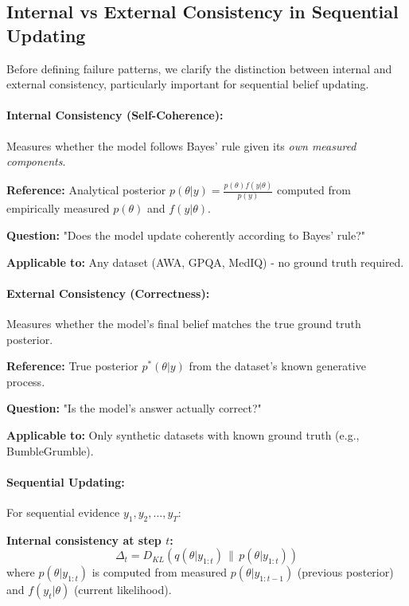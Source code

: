 \documentclass{article}
\theoremstyle{definition}
\begin{document}
\subsection{Internal vs External Consistency in Sequential Updating}

Before defining failure patterns, we clarify the distinction between internal and external consistency, particularly important for sequential belief updating.

\paragraph{Internal Consistency (Self-Coherence):} Measures whether the model follows Bayes' rule given its \emph{own measured components}.

\textbf{Reference:} Analytical posterior $p(\theta|y) = \frac{p(\theta) f(y|\theta)}{p(y)}$ computed from empirically measured $p(\theta)$ and $f(y|\theta)$.

\textbf{Question:} "Does the model update coherently according to Bayes' rule?"

\textbf{Applicable to:} Any dataset (AWA, GPQA, MedIQ) - no ground truth required.

\paragraph{External Consistency (Correctness):} Measures whether the model's final belief matches the true ground truth posterior.

\textbf{Reference:} True posterior $p^*(\theta|y)$ from the dataset's known generative process.

\textbf{Question:} "Is the model's answer actually correct?"

\textbf{Applicable to:} Only synthetic datasets with known ground truth (e.g., BumbleGrumble).

\paragraph{Sequential Updating:} For sequential evidence $y_1, y_2, \ldots, y_T$:

\textbf{Internal consistency at step $t$:}
\begin{equation}
\Delta_t = D_{KL}(q(\theta|y_{1:t}) \,\|\, p(\theta|y_{1:t}))
\end{equation}
where $p(\theta|y_{1:t})$ is computed from measured $p(\theta|y_{1:t-1})$ (previous posterior) and $f(y_t|\theta)$ (current likelihood).
\end{document}
